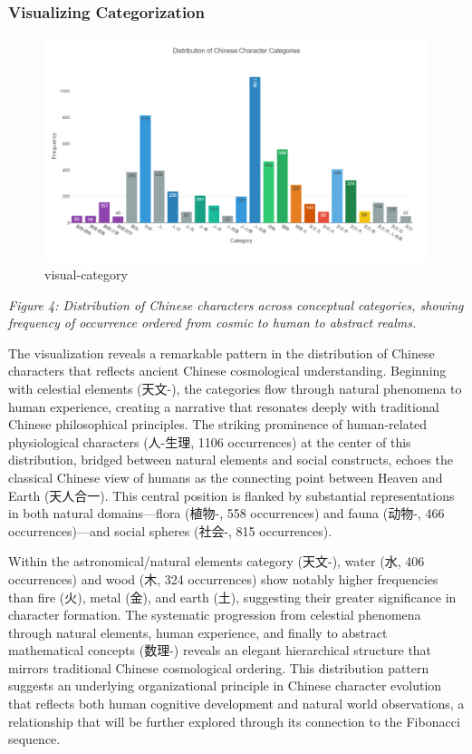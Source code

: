 \hypertarget{visualizing-categorization}{%
\subsubsection{Visualizing
Categorization}\label{visualizing-categorization}}

\begin{figure}
\centering
\includegraphics{./images/zi_category_histogram.png}
\caption{visual-category}
\end{figure}

\emph{Figure 4: Distribution of Chinese characters across conceptual
categories, showing frequency of occurrence ordered from cosmic to human
to abstract realms.}

The visualization reveals a remarkable pattern in the distribution of
Chinese characters that reflects ancient Chinese cosmological
understanding. Beginning with celestial elements (天文-), the categories
flow through natural phenomena to human experience, creating a narrative
that resonates deeply with traditional Chinese philosophical principles.
The striking prominence of human-related physiological characters
(人-生理, 1106 occurrences) at the center of this distribution, bridged
between natural elements and social constructs, echoes the classical
Chinese view of humans as the connecting point between Heaven and Earth
(天人合一). This central position is flanked by substantial
representations in both natural domains---flora (植物-, 558 occurrences)
and fauna (动物-, 466 occurrences)---and social spheres (社会-, 815
occurrences).

Within the astronomical/natural elements category (天文-), water (水,
406 occurrences) and wood (木, 324 occurrences) show notably higher
frequencies than fire (火), metal (金), and earth (土), suggesting their
greater significance in character formation. The systematic progression
from celestial phenomena through natural elements, human experience, and
finally to abstract mathematical concepts (数理-) reveals an elegant
hierarchical structure that mirrors traditional Chinese cosmological
ordering. This distribution pattern suggests an underlying
organizational principle in Chinese character evolution that reflects
both human cognitive development and natural world observations, a
relationship that will be further explored through its connection to the
Fibonacci sequence.

